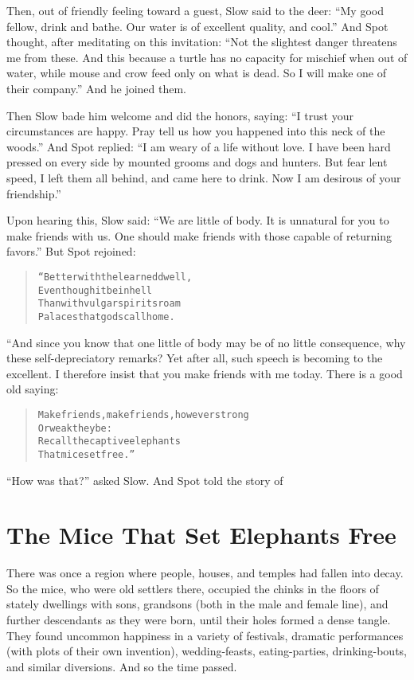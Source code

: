 \documentclass[article, twoside, 10pt]{memoir}
\renewenvironment{verbatim}{%
\begin{quote}%
\vskip -10pt%
\begin{alltt}\normalfont\small}{\end{alltt}%
\end{quote}%
\vskip -10pt
} %
\begin{document}
Then, out of friendly feeling toward a guest, Slow said to the
deer:
``My good fellow, drink and bathe. Our water is of excellent quality, and cool.''
And Spot thought, after meditating on this invitation:
``Not the slightest danger threatens me from these. And this because a turtle has no capacity for mischief when out of water, while mouse and crow feed only on what is dead. So I will make one of their company.''
And he joined them.

Then Slow bade him welcome and did the honors, saying:
``I trust your circumstances are happy. Pray tell us how you happened into this neck of the woods.''
And Spot replied:
``I am weary of a life without love. I have been hard pressed on every side by mounted grooms and dogs and hunters. But fear lent speed, I left them all behind, and came here to drink. Now I am desirous of your friendship.''

Upon hearing this, Slow said:
``We are little of body. It is unnatural for you to make friends with us. One should make friends with those capable of returning favors.''
But Spot rejoined:

\begin{verbatim}
“Better with the learned dwell,
Even though it be in hell
Than with vulgar spirits roam
Palaces that gods call home.
\end{verbatim}
“And since you know that one little of body may be of no little
consequence, why these self-depreciatory remarks? Yet after all,
such speech is becoming to the excellent. I therefore insist that
you make friends with me today. There is a good old saying:

\begin{verbatim}
Make friends, make friends, however strong
    Or weak they be:
Recall the captive elephants
    That mice set free.”
\end{verbatim}
``How was that?'' asked Slow. And Spot told the story of

\chapter{The Mice That Set Elephants Free}

There was once a region where people, houses, and temples had
fallen into decay. So the mice, who were old settlers there,
occupied the chinks in the floors of stately dwellings with sons,
grandsons (both in the male and female line), and further
descendants as they were born, until their holes formed a dense
tangle. They found uncommon happiness in a variety of festivals,
dramatic performances (with plots of their own invention),
wedding-feasts, eating-parties, drinking-bouts, and similar
diversions. And so the time passed.
\end{document}
